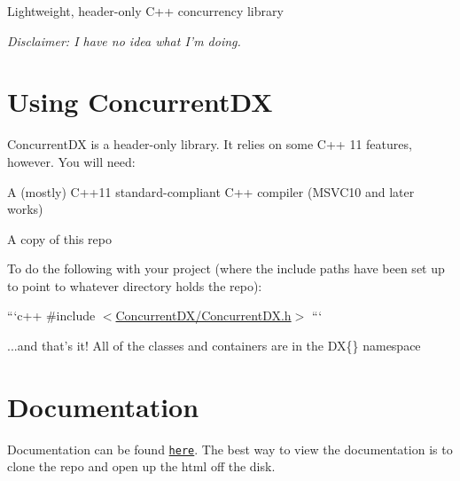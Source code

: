 Lightweight, header-\/only C++ concurrency library

{\itshape Disclaimer\-: I have no idea what I'm doing.}

\section*{Using Concurrent\-D\-X}

Concurrent\-D\-X is a header-\/only library. It relies on some C++ 11 features, however. You will need\-:


\begin{DoxyItemize}
\item A (mostly) C++11 standard-\/compliant C++ compiler (M\-S\-V\-C10 and later works)
\item A copy of this repo
\item To do the following with your project (where the include paths have been set up to point to whatever directory holds the repo)\-:
\end{DoxyItemize}

```c++ \#include $<$\hyperlink{_concurrent_d_x_8h_source}{Concurrent\-D\-X/\-Concurrent\-D\-X.\-h}$>$ ```
\begin{DoxyItemize}
\item ...and that's it! All of the classes and containers are in the D\-X\{\} namespace
\end{DoxyItemize}

\section*{Documentation}

Documentation can be found \href{/html/index.html}{\tt here}. The best way to view the documentation is to clone the repo and open up the html off the disk. 